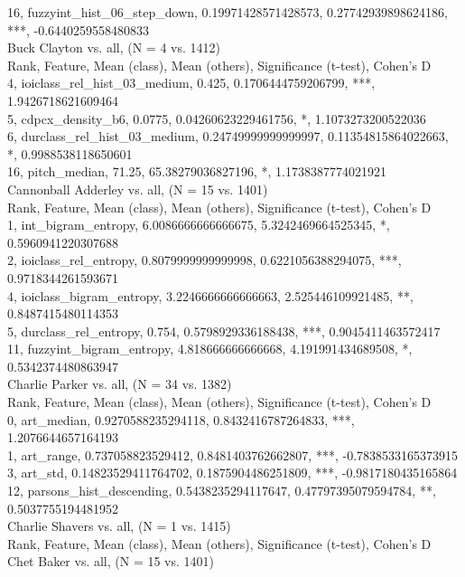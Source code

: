 16, fuzzyint_hist_06_step_down, 0.19971428571428573, 0.27742939898624186, ***, -0.6440259558480833\\
Buck Clayton vs. all, (N = 4 vs. 1412)\\
Rank, Feature, Mean (class), Mean (others), Significance (t-test), Cohen's D\\
4, ioiclass_rel_hist_03_medium, 0.425, 0.1706444759206799, ***, 1.9426718621609464\\
5, cdpcx_density_b6, 0.0775, 0.04260623229461756, *, 1.1073273200522036\\
6, durclass_rel_hist_03_medium, 0.24749999999999997, 0.11354815864022663, *, 0.9988538118650601\\
16, pitch_median, 71.25, 65.38279036827196, *, 1.1738387774021921\\
Cannonball Adderley vs. all, (N = 15 vs. 1401)\\
Rank, Feature, Mean (class), Mean (others), Significance (t-test), Cohen's D\\
1, int_bigram_entropy, 6.0086666666666675, 5.3242469664525345, *, 0.5960941220307688\\
2, ioiclass_rel_entropy, 0.8079999999999998, 0.6221056388294075, ***, 0.9718344261593671\\
4, ioiclass_bigram_entropy, 3.2246666666666663, 2.525446109921485, **, 0.8487415480114353\\
5, durclass_rel_entropy, 0.754, 0.5798929336188438, ***, 0.9045411463572417\\
11, fuzzyint_bigram_entropy, 4.818666666666668, 4.191991434689508, *, 0.5342374480863947\\
Charlie Parker vs. all, (N = 34 vs. 1382)\\
Rank, Feature, Mean (class), Mean (others), Significance (t-test), Cohen's D\\
0, art_median, 0.9270588235294118, 0.8432416787264833, ***, 1.2076644657164193\\
1, art_range, 0.737058823529412, 0.8481403762662807, ***, -0.7838533165373915\\
3, art_std, 0.14823529411764702, 0.1875904486251809, ***, -0.9817180435165864\\
12, parsons_hist_descending, 0.5438235294117647, 0.47797395079594784, **, 0.5037755194481952\\
Charlie Shavers vs. all, (N = 1 vs. 1415)\\
Rank, Feature, Mean (class), Mean (others), Significance (t-test), Cohen's D\\
Chet Baker vs. all, (N = 15 vs. 1401)\\
